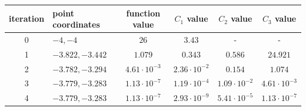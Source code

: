 \documentclass[12pt]{article}
\begin{document}
\begin{table}[H]
	\begin{tabularx}{\textwidth}{c|X|c|c|c|c|}
		iteration & point coordinates & function value & $C_1$ value & $C_2$ value & $C_3$ value\\
		\hline
		0 & $-4, -4$ & $26$ & $3.43$ & - & - \\
		\hline
		1 & $-3.822, -3.442$ & $1.079$ & $0.343$ & $0.586$ & $24.921$ \\
		\hline
		2 & $-3.782, -3.294$ & $4.61\cdot10^{-3}$ & $2.36\cdot10^{-2}$ & $0.154$ & $1.074$ \\
		\hline
		3 & $-3.779, -3.283$ & $1.13\cdot10^{-7}$ & $1.19\cdot10^{-4}$ & $1.09\cdot10^{-2}$ & $4.61\cdot10^{-3}$ \\ 
		\hline
		4 & $-3.779, -3.283$ & $1.13\cdot10^{-7}$ & $2.93\cdot10^{-9}$ & $5.41\cdot10^{-5}$ & $1.13\cdot10^{-7}$ \\
		\hline
	\end{tabularx}	
\end{table}	
\end{document}
